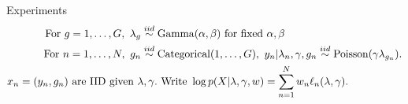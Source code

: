 
\begin{frame}{Experiments}
%
\begin{align*}
\textrm{For }g=1,\ldots,G,\textrm{ }
    \lambda_g \iid{}& \mathrm{Gamma}(\alpha, \beta) \textrm{ for fixed }\alpha,\beta\\
\textrm{For }n = 1,\ldots,N,\textrm{ }
    g_n \iid{}& \mathrm{Categorical}(1,\ldots,G),\textrm{ }
    y_n | \lambda_n, \gamma, g_n \iid{}
        \mathrm{Poisson}(\gamma \lambda_{g_n}).\\
\x_n ={} (y_n, g_n)
\textrm{ are IID given } \lambda, \gamma. &
\textrm{   Write }\log \p(\xvec \vert \lambda, \gamma, \w) =
   \sumn \w_n \ell_n(\lambda, \gamma).
%
\end{align*}

\pause

%
\HighDimAccuracyGraph{}

\end{frame}
    



